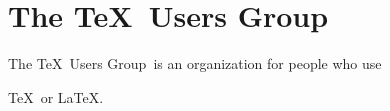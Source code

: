 \documentclass{article}
\newcommand{\TUG}{\TeX\ Users Group}
\begin{document}
\section{The \TUG}

The \TUG\ is an organization for people who use

\TeX\ or \LaTeX.
\end{document}

